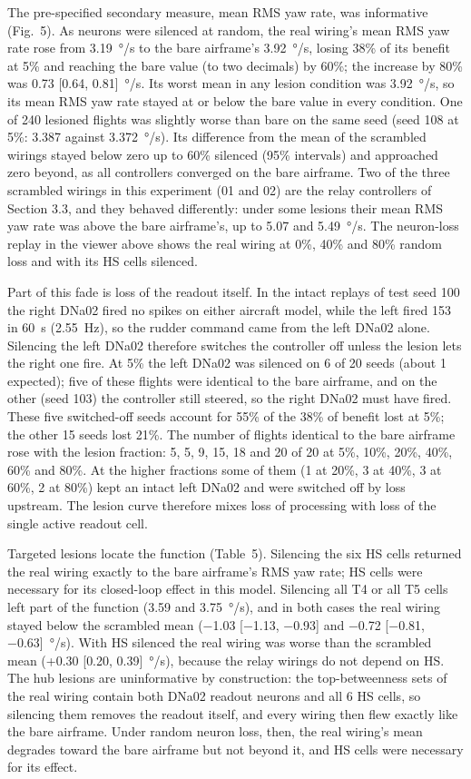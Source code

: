 \documentclass[11pt,letterpaper]{article}
\begin{document}
The pre-specified secondary measure, mean RMS yaw rate, was informative
(Fig.~5). As neurons were silenced at random, the real wiring's mean RMS
yaw rate rose from 3.19~°/s to the bare airframe's 3.92~°/s, losing 38\%
of its benefit at 5\% and reaching the bare value (to two decimals) by
60\%; the increase by 80\% was 0.73 {{[}0.64, 0.81{]}}~°/s. Its worst
mean in any lesion condition was 3.92~°/s, so its mean RMS yaw rate
stayed at or below the bare value in every condition. One of 240
lesioned flights was slightly worse than bare on the same seed (seed 108
at 5\%: 3.387 against 3.372~°/s). Its difference from the mean of the
scrambled wirings stayed below zero up to 60\% silenced (95\% intervals)
and approached zero beyond, as all controllers converged on the bare
airframe. Two of the three scrambled wirings in this experiment (01 and
02) are the relay controllers of Section 3.3, and they behaved
differently: under some lesions their mean RMS yaw rate was above the
bare airframe's, up to 5.07 and 5.49~°/s. The neuron-loss replay in the
viewer above shows the real wiring at 0\%, 40\% and 80\% random loss and
with its HS cells silenced.

Part of this fade is loss of the readout itself. In the intact replays
of test seed 100 the right DNa02 fired no spikes on either aircraft
model, while the left fired 153 in 60~s (2.55~Hz), so the rudder command
came from the left DNa02 alone. Silencing the left DNa02 therefore
switches the controller off unless the lesion lets the right one fire.
At 5\% the left DNa02 was silenced on 6 of 20 seeds (about 1 expected);
five of these flights were identical to the bare airframe, and on the
other (seed 103) the controller still steered, so the right DNa02 must
have fired. These five switched-off seeds account for 55\% of the 38\%
of benefit lost at 5\%; the other 15 seeds lost 21\%. The number of
flights identical to the bare airframe rose with the lesion fraction: 5,
5, 9, 15, 18 and 20 of 20 at 5\%, 10\%, 20\%, 40\%, 60\% and 80\%. At
the higher fractions some of them (1 at 20\%, 3 at 40\%, 3 at 60\%, 2 at
80\%) kept an intact left DNa02 and were switched off by loss upstream.
The lesion curve therefore mixes loss of processing with loss of the
single active readout cell.

Targeted lesions locate the function (Table~5). Silencing the six HS
cells returned the real wiring exactly to the bare airframe's RMS yaw
rate; HS cells were necessary for its closed-loop effect in this model.
Silencing all T4 or all T5 cells left part of the function (3.59 and
3.75~°/s), and in both cases the real wiring stayed below the scrambled
mean (−1.03 {{[}−1.13, −0.93{]}} and −0.72 {{[}−0.81, −0.63{]}}~°/s).
With HS silenced the real wiring was worse than the scrambled mean
(+0.30 {{[}0.20, 0.39{]}}~°/s), because the relay wirings do not depend
on HS. The hub lesions are uninformative by construction: the
top-betweenness sets of the real wiring contain both DNa02 readout
neurons and all 6 HS cells, so silencing them removes the readout
itself, and every wiring then flew exactly like the bare airframe. Under
random neuron loss, then, the real wiring's mean degrades toward the
bare airframe but not beyond it, and HS cells were necessary for its
effect.
\end{document}

